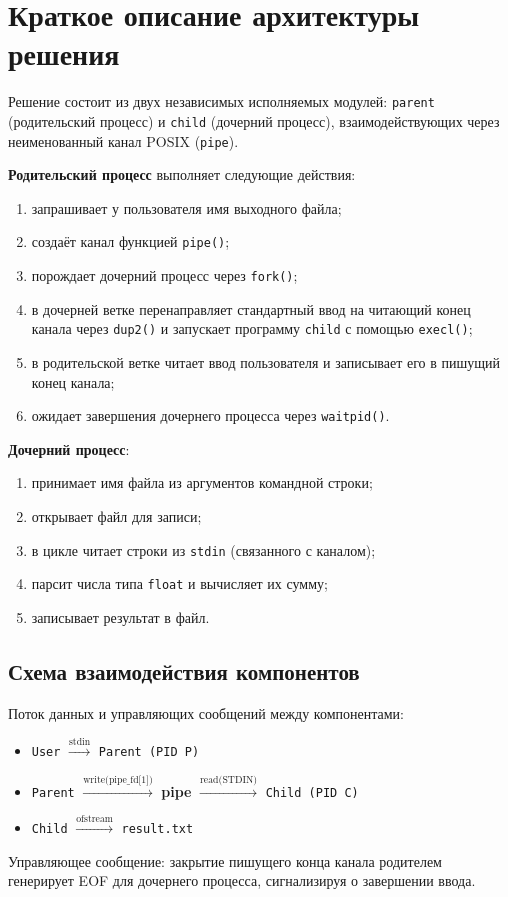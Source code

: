 \documentclass[11pt, a4paper]{article}
\begin{document}
\section{Краткое описание архитектуры решения}
Решение состоит из двух независимых исполняемых модулей: \texttt{parent} (родительский процесс) и \texttt{child} (дочерний процесс), взаимодействующих через неименованный канал POSIX (\texttt{pipe}).

\textbf{Родительский процесс} выполняет следующие действия:
\begin{enumerate}
    \item запрашивает у пользователя имя выходного файла;
    \item создаёт канал функцией \texttt{pipe()};
    \item порождает дочерний процесс через \texttt{fork()};
    \item в дочерней ветке перенаправляет стандартный ввод на читающий конец канала через \texttt{dup2()} и запускает программу \texttt{child} с помощью \texttt{execl()};
    \item в родительской ветке читает ввод пользователя и записывает его в пишущий конец канала;
    \item ожидает завершения дочернего процесса через \texttt{waitpid()}.
\end{enumerate}

\textbf{Дочерний процесс}:
\begin{enumerate}
    \item принимает имя файла из аргументов командной строки;
    \item открывает файл для записи;
    \item в цикле читает строки из \texttt{stdin} (связанного с каналом);
    \item парсит числа типа \texttt{float} и вычисляет их сумму;
    \item записывает результат в файл.
\end{enumerate}

\subsection{Схема взаимодействия компонентов}
Поток данных и управляющих сообщений между компонентами:
\begin{itemize}
    \item \texttt{User} $\xrightarrow{\text{stdin}}$ \texttt{Parent (PID P)}
    \item \texttt{Parent} $\xrightarrow{\text{write(pipe\_fd[1])}}$ \textbf{pipe} $\xrightarrow{\text{read(STDIN)}}$ \texttt{Child (PID C)}
    \item \texttt{Child} $\xrightarrow{\text{ofstream}}$ \texttt{result.txt}
\end{itemize}
Управляющее сообщение: закрытие пишущего конца канала родителем генерирует EOF для дочернего процесса, сигнализируя о завершении ввода.
\end{document}
